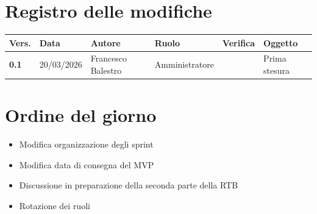 \documentclass[a4paper,12pt]{article}
\begin{document}
    

    \newpage
    \section*{Registro delle modifiche}

    \begin{table}[h!]
        \begin{tabularx}{\textwidth}{|l|l|l|l|X|X|}
            \hline
            \textbf{Vers.} & \textbf{Data} & \textbf{Autore} & \textbf{Ruolo} & \textbf{Verifica} & \textbf{Oggetto} \\
            \hline
            \textbf{0.1} & 20/03/2026 & Francesco Balestro & Amministratore &  & Prima stesura \\
        \hline
        \end{tabularx}
    \end{table}

    \newpage
    \tableofcontents
    \newpage

    \section{Ordine del giorno} {
        \begin{itemize}
            \item Modifica organizzazione degli sprint
            \item Modifica data di consegna del MVP
            \item Discussione in preparazione della seconda parte della RTB
            \item Rotazione dei ruoli
        \end{itemize}
    }
\end{document}
